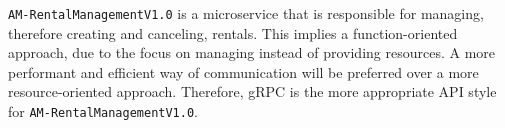 \texttt{AM-RentalManagementV1.0} is a microservice that is responsible for managing, therefore creating and canceling, rentals.
This implies a function-oriented approach, due to the focus on managing instead of providing resources.
A more performant and efficient way of communication will be preferred over a more resource-oriented approach.
Therefore, gRPC is the more appropriate API style for \texttt{AM-RentalManagementV1.0}.